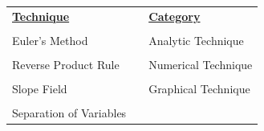 \begin{enumerate}
\begin{center}
\begin{tabular}{lll}
\textbf{\underline{Technique}} & \hspace{2in} & \textbf{\underline{Category}} \\
& \hspace{2in} & \\
Euler's Method & \hspace{2in} & Analytic Technique \\
& \hspace{2in} & \\
Reverse Product Rule & \hspace{2in} & Numerical Technique \\
 &\hspace{2in} & \\
Slope Field & \hspace{2in} & Graphical Technique \\
& \hspace{2in} & \\
Separation of Variables & \hspace{2in} &
\end{tabular}
\end{center}


\end{enumerate}